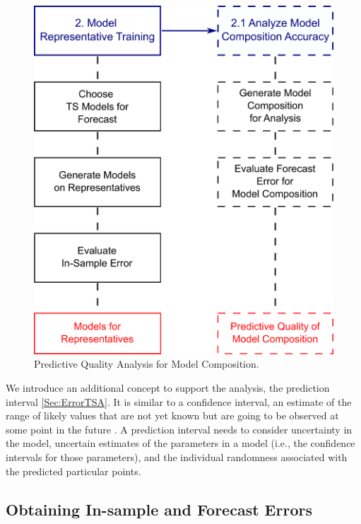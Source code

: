 \begin{figure}[h!]
	\centering
	\includegraphics[scale=0.18]{Figures/Experiments_Methodology_Step2_Step2.1_corrections}
	\caption{Predictive Quality Analysis for Model Composition.}
	\label{Fig:MethodologyExperiments}
\end{figure}

We introduce an additional concept to support the analysis, the prediction interval \ref{Sec:ErrorTSA}. It is similar to a confidence interval, an estimate of the range of likely values that are not yet known but are going to be observed at some point in the future \cite{Chatfield2001}. A prediction interval needs to consider uncertainty in the model, uncertain estimates of the parameters in a model (i.e., the confidence intervals for those parameters), and the individual randomness associated with the predicted particular points.

\subsection{Obtaining In-sample and Forecast Errors}
\label{sec:InSampleForecastErrors}

